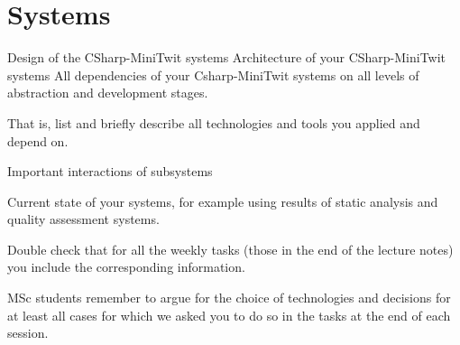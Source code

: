 \section{Systems}


Design of the CSharp-MiniTwit systems
Architecture of your CSharp-MiniTwit systems
All dependencies of your Csharp-MiniTwit systems on all levels of abstraction and development stages.

That is, list and briefly describe all technologies and tools you applied and depend on.

Important interactions of subsystems

Current state of your systems, for example using results of static analysis and quality assessment systems.

Double check that for all the weekly tasks (those in the end of the lecture notes) you include the corresponding information.

MSc students remember to argue for the choice of technologies and decisions for at least all cases for which we asked you to do so in the tasks at the end of each session.